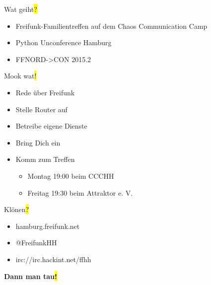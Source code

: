 \documentclass[t]{beamer}
\begin{document}
\begin{frame}{Wat geiht\hl{?}}
    \begin{itemize}
        \item Freifunk-Familientreffen auf dem Chaos Communication Camp
        \item Python Unconference Hamburg
        \item FFNORD->CON 2015.2
    \end{itemize}
\end{frame}

\begin{frame}{Mook wat\hl{!}}
    \begin{itemize}
        \item Rede über Freifunk
        \item Stelle Router auf
        \item Betreibe eigene Dienste
        \item Bring Dich ein
        \item Komm zum Treffen
        \begin{itemize}
            \item Montag 19:00 beim CCCHH
            \item Freitag 19:30 beim Attraktor e. V.
        \end{itemize}
    \end{itemize}
\end{frame}

\begin{frame}{Klönen\hl{?}}
    \begin{itemize}
        \item hamburg.freifunk.net
        \item @FreifunkHH
        \item irc://irc.hackint.net/ffhh
    \end{itemize}
\end{frame}

\begin{frame}{}
    \vspace{1.6cm}
    \centering 
    \vspace{0.8cm}

    {\Huge\bf Dann man tau\hl{!}}
\end{frame}
\end{document}

